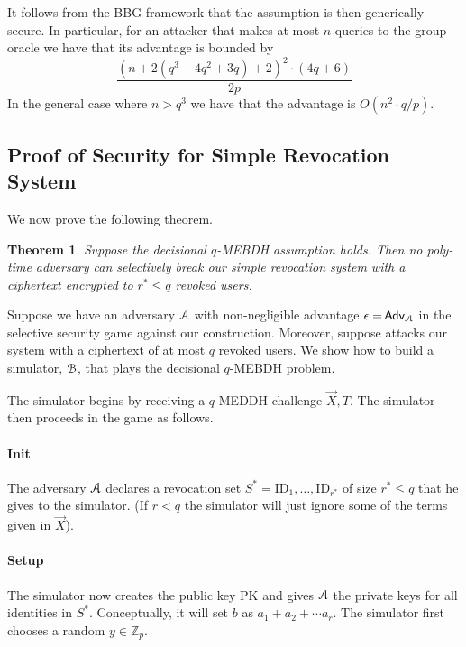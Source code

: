 \documentclass[a4paper, 11pt]{article}
\newtheorem{theorem}{Theorem}
\newcommand{\comment}[1]{}
\newcommand{\Advx}[2]{\mathsf{{#1}\,Adv}_{#2}}
\newcommand{\Adv}[1] {\Advx{#1}{\AlgA}}
\newcommand{\Z}{\ensuremath{\mathbb{Z}}}
\newtheorem{theorem}{Theorem}[section]
\theoremstyle{definition}
\newcommand{\AlgA}{\ensuremath{{\cal A}}}
\newcommand{\AlgB}{\ensuremath{{\cal B}}}
\newcommand{\PK}{\ensuremath{\textrm{PK}}}
\newcommand{\ID}{\ensuremath{\textrm{ID}}}
\begin{document}
It follows from the BBG framework that the assumption is then
generically secure.  In particular, for an attacker that makes at most
$n$ queries to the group oracle we have that its advantage is bounded
by
\[
\frac{(n+ 2(q^3 + 4q^2+3q)  +2)^2 \cdot (4q+6 )}{2p}
\]
In the general case where $n > q^3$ we have that the advantage is
$O(n^2\cdot q / p)$.

\subsection{Proof of Security for Simple Revocation System}
\label{sec:proof}

We now prove the following theorem.

\begin{theorem}
Suppose the decisional $q$-MEBDH assumption holds. Then no poly-time adversary
can selectively break our simple revocation system with a ciphertext encrypted to $r^* \leq q$
revoked users.
\end{theorem}

Suppose we have an adversary $\AlgA$ with non-negligible advantage
$\Adv{\epsilon=}$ in the selective security game against our
construction. Moreover, suppose attacks our system with a ciphertext
of at most $q$ revoked users. We show how to build a
simulator, $\AlgB$, that plays the decisional $q$-MEBDH problem.



The simulator begins by receiving a $q$-MEDDH
challenge $\vec{X},T$.
The simulator then proceeds in the game as follows.

\paragraph{Init}
The adversary $\AlgA$ declares a revocation set $S^*=\ID_1,\ldots,
\ID_{r^*}$  of size $r^* \leq q$
that he gives to the simulator. (If $r < q$ the simulator
will just ignore some of the terms given in $\vec{X}$).

\paragraph{Setup}
The simulator now creates the public key $\PK$ and gives $\AlgA$ the
private keys for all identities in $S^*$.
Conceptually, it will set $b$ as $a_1+a_2+\cdots a_r$. The simulator first
chooses a random $y \in \Z_p$.

\comment{
Next, it sets
\[ w_{i,j} =
\begin{cases}
  1 \quad \textrm{if~} i=j\\
  2 \quad \textrm{if~} i \neq j\\
\end{cases}
\]
}
\end{document}
